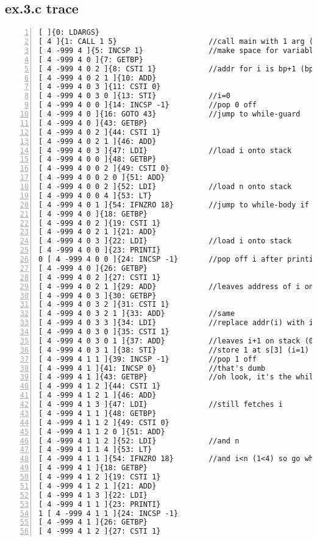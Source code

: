 \documentclass[a4paper, titlepage]{article}
\begin{document}
\subsection*{ex.3.c trace}
\begin{lstlisting}[numbers=left, title=ex.3.c.trace]
[ ]{0: LDARGS}
[ 4 ]{1: CALL 1 5}                     //call main with 1 arg (4)
[ 4 -999 4 ]{5: INCSP 1}               //make space for variable i
[ 4 -999 4 0 ]{7: GETBP}
[ 4 -999 4 0 2 ]{8: CSTI 1}            //addr for i is bp+1 (bp holds n)
[ 4 -999 4 0 2 1 ]{10: ADD}
[ 4 -999 4 0 3 ]{11: CSTI 0}
[ 4 -999 4 0 3 0 ]{13: STI}            //i=0
[ 4 -999 4 0 0 ]{14: INCSP -1}         //pop 0 off
[ 4 -999 4 0 ]{16: GOTO 43}            //jump to while-guard
[ 4 -999 4 0 ]{43: GETBP}
[ 4 -999 4 0 2 ]{44: CSTI 1}
[ 4 -999 4 0 2 1 ]{46: ADD}
[ 4 -999 4 0 3 ]{47: LDI}              //load i onto stack
[ 4 -999 4 0 0 ]{48: GETBP}
[ 4 -999 4 0 0 2 ]{49: CSTI 0}
[ 4 -999 4 0 0 2 0 ]{51: ADD}
[ 4 -999 4 0 0 2 ]{52: LDI}            //load n onto stack
[ 4 -999 4 0 0 4 ]{53: LT}
[ 4 -999 4 0 1 ]{54: IFNZRO 18}        //jump to while-body if i<n
[ 4 -999 4 0 ]{18: GETBP}
[ 4 -999 4 0 2 ]{19: CSTI 1}
[ 4 -999 4 0 2 1 ]{21: ADD}
[ 4 -999 4 0 3 ]{22: LDI}              //load i onto stack
[ 4 -999 4 0 0 ]{23: PRINTI}
0 [ 4 -999 4 0 0 ]{24: INCSP -1}       //pop off i after printing it
[ 4 -999 4 0 ]{26: GETBP}
[ 4 -999 4 0 2 ]{27: CSTI 1}
[ 4 -999 4 0 2 1 ]{29: ADD}            //leaves address of i on stack
[ 4 -999 4 0 3 ]{30: GETBP}
[ 4 -999 4 0 3 2 ]{31: CSTI 1}
[ 4 -999 4 0 3 2 1 ]{33: ADD}          //same
[ 4 -999 4 0 3 3 ]{34: LDI}            //replace addr(i) with i (s[3]=0)
[ 4 -999 4 0 3 0 ]{35: CSTI 1}
[ 4 -999 4 0 3 0 1 ]{37: ADD}          //leaves i+1 on stack (0+1=1)
[ 4 -999 4 0 3 1 ]{38: STI}            //store 1 at s[3] (i=1)
[ 4 -999 4 1 1 ]{39: INCSP -1}         //pop 1 off
[ 4 -999 4 1 ]{41: INCSP 0}            //that's dumb
[ 4 -999 4 1 ]{43: GETBP}              //oh look, it's the while-guard again!
[ 4 -999 4 1 2 ]{44: CSTI 1}
[ 4 -999 4 1 2 1 ]{46: ADD}
[ 4 -999 4 1 3 ]{47: LDI}              //still fetches i
[ 4 -999 4 1 1 ]{48: GETBP}
[ 4 -999 4 1 1 2 ]{49: CSTI 0}
[ 4 -999 4 1 1 2 0 ]{51: ADD}
[ 4 -999 4 1 1 2 ]{52: LDI}            //and n
[ 4 -999 4 1 1 4 ]{53: LT}
[ 4 -999 4 1 1 ]{54: IFNZRO 18}        //and i<n (1<4) so go while-body!
[ 4 -999 4 1 ]{18: GETBP}
[ 4 -999 4 1 2 ]{19: CSTI 1}
[ 4 -999 4 1 2 1 ]{21: ADD}
[ 4 -999 4 1 3 ]{22: LDI}
[ 4 -999 4 1 1 ]{23: PRINTI}
1 [ 4 -999 4 1 1 ]{24: INCSP -1}
[ 4 -999 4 1 ]{26: GETBP}
[ 4 -999 4 1 2 ]{27: CSTI 1}

\end{lstlisting}
\end{document}
